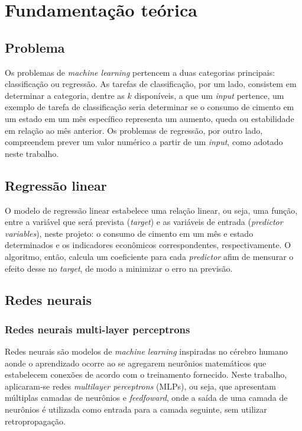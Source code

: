 
\chapter{Fundamentação teórica}

\section*{Problema}

  Os problemas de \textit{machine learning} pertencem a duas categorias principais: classificação ou regressão. As tarefas de classificação, por um lado, consistem em determinar a categoria, dentre as $k$ disponíveis, a que um \textit{input} pertence, um exemplo de tarefa de classificação seria determinar se o consumo de cimento em um estado em um mês específico representa um aumento, queda ou estabilidade em relação ao mês anterior. Os problemas de regressão, por outro lado, compreendem prever um valor numérico a partir de um \textit{input}, \cite{Goodfellow-et-al-2016} como adotado neste trabalho.

  
\section*{Regressão linear}
O modelo de regressão linear estabelece uma relação linear, ou seja, uma função, entre a variável que será prevista (\textit{target}) e as variáveis de entrada (\textit{predictor variables}), neste projeto: o consumo de cimento em um mês e estado determinados e os indicadores econômicos correspondentes, respectivamente. O algoritmo, então, calcula um coeficiente para cada \textit{predictor} afim de mensurar o efeito desse no \textit{target}, de modo a minimizar o erro na previsão.
     
\section*{Redes neurais}

\subsection*{Redes neurais multi-layer perceptrons}
Redes neurais são modelos de \textit{machine learning} inspiradas no cérebro humano aonde o aprendizado ocorre ao se agregarem neurônios matemáticos que estabelecem conexões de acordo com o treinamento fornecido. Neste trabalho, aplicaram-se redes \textit{multilayer perceptrons} (MLPs), ou seja, que apresentam múltiplas camadas de neurônios e \textit{feedfoward}, onde a saída de uma camada de neurônios é utilizada como entrada para a camada seguinte, sem utilizar retropropagação.
          
